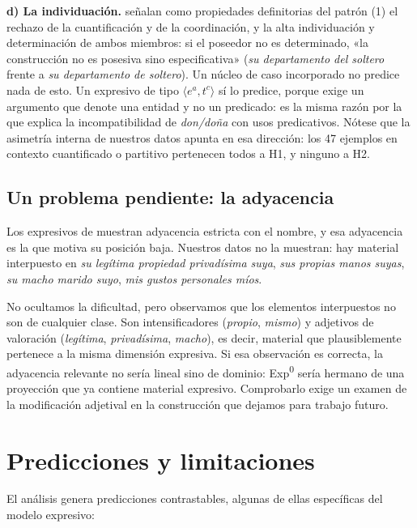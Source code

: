 \documentclass[12pt,a4paper]{article}
\begin{document}
\textbf{d) La individuación.} \textcite[192--193]{companycompanyhuertaflores2017} señalan como propiedades definitorias del patrón (1) el rechazo de la cuantificación y de la coordinación, y la alta individuación y determinación de ambos miembros: si el poseedor no es determinado, «la construcción no es posesiva sino especificativa» (\textit{su departamento del soltero} frente a \textit{su departamento de soltero}). Un núcleo de caso incorporado no predice nada de esto. Un expresivo de tipo $\langle e^a, t^c \rangle$ sí lo predice, porque exige un argumento que denote una entidad y no un predicado: es la misma razón por la que \textcite{saab2021} explica la incompatibilidad de \textit{don/doña} con usos predicativos. Nótese que la asimetría interna de nuestros datos apunta en esa dirección: los 47 ejemplos en contexto cuantificado o partitivo pertenecen todos a H1, y ninguno a H2.

\subsection{Un problema pendiente: la adyacencia}

Los expresivos de \textcite{saab2021} muestran adyacencia estricta con el nombre, y esa adyacencia es la que motiva su posición baja. Nuestros datos no la muestran: hay material interpuesto en \textit{su legítima propiedad privadísima suya}, \textit{sus propias manos suyas}, \textit{su macho marido suyo}, \textit{mis gustos personales míos}.

No ocultamos la dificultad, pero observamos que los elementos interpuestos no son de cualquier clase. Son intensificadores (\textit{propio}, \textit{mismo}) y adjetivos de valoración (\textit{legítima}, \textit{privadísima}, \textit{macho}), es decir, material que plausiblemente pertenece a la misma dimensión expresiva. Si esa observación es correcta, la adyacencia relevante no sería lineal sino de dominio: Exp\textsuperscript{0} sería hermano de una proyección que ya contiene material expresivo. Comprobarlo exige un examen de la modificación adjetival en la construcción que dejamos para trabajo futuro.

\section{Predicciones y limitaciones}

El análisis genera predicciones contrastables, algunas de ellas específicas del modelo expresivo:
\end{document}
